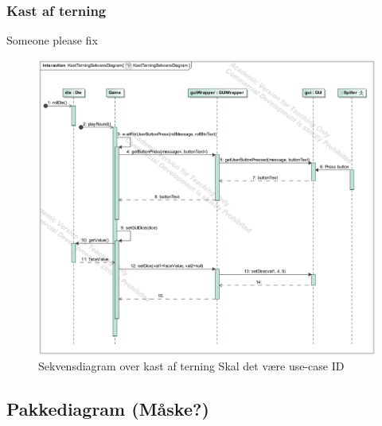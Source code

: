 \documentclass[../main.tex]{subfiles}
\begin{document}
\subsubsection{Kast af terning}
\TODO Someone please fix
\begin{figure}[H]
    \centering
    \includegraphics[width=0.7\linewidth]{figures/sekvensDiagrammer/KastTerningSekvensDiagram.png}
    \caption{Sekvensdiagram over kast af terning \TODO Skal det være use-case ID}
    \label{fig:sekvensKastTerning}
\end{figure}

\subsection{Pakkediagram (Måske?) }
\end{document}
